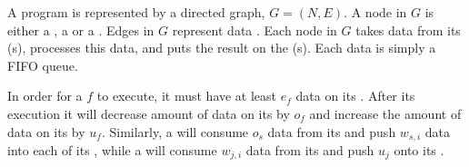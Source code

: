 A {\StreamIt} program is represented by a directed graph, $G = (N,
E)$.  A node in $G$ is either a {\filter}, a {\splitter} or a
{\joiner}. Edges in $G$ represent data {\Channels}.  Each node in
$G$ takes data from its {\Input} {\Channel}(s), processes this data,
and puts the result on the {\Output} {\Channel}(s).  Each data
{\Channel} is simply a FIFO queue.

In order for a {\filter} $f$ to execute, it must have at least $e_f$
data on its {\Input} {\Channel}. After its execution it will decrease
amount of data on its {\Input} {\Channel} by $o_f$ and increase the
amount of data on its {\Output} {\Channel} by $u_f$. Similarly, a
{\splitter} will consume $o_s$ data from its {\Input} {\Channel} and
push $w_{s,i}$ data into each of its {\Output} {\Channels}, while a
{\joiner} will consume $w_{j,i}$ data from its {\Input} {\Channels} and
push $u_j$ onto its {\Output} {\Channel}.

